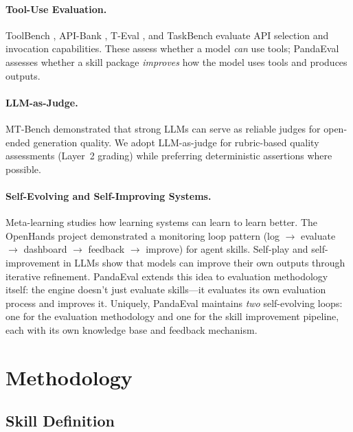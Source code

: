 \documentclass[11pt,a4paper]{article}
\begin{document}
\paragraph{Tool-Use Evaluation.}
ToolBench \citep{qin2023toolllm}, API-Bank \citep{li2023apibank}, T-Eval \citep{chen2023teval}, and TaskBench \citep{shen2023taskbench} evaluate API selection and invocation capabilities. These assess whether a model \emph{can} use tools; PandaEval assesses whether a skill package \emph{improves} how the model uses tools and produces outputs.

\paragraph{LLM-as-Judge.}
MT-Bench \citep{zheng2023judging} demonstrated that strong LLMs can serve as reliable judges for open-ended generation quality. We adopt LLM-as-judge for rubric-based quality assessments (Layer~2 grading) while preferring deterministic assertions where possible.

\paragraph{Self-Evolving and Self-Improving Systems.}
Meta-learning \citep{hospedales2022metalearning} studies how learning systems can learn to learn better. The OpenHands project demonstrated a monitoring loop pattern (log $\rightarrow$ evaluate $\rightarrow$ dashboard $\rightarrow$ feedback $\rightarrow$ improve) for agent skills. Self-play and self-improvement in LLMs \citep{huang2023selfimprove} show that models can improve their own outputs through iterative refinement. PandaEval extends this idea to evaluation methodology itself: the engine doesn't just evaluate skills---it evaluates its own evaluation process and improves it. Uniquely, PandaEval maintains \emph{two} self-evolving loops: one for the evaluation methodology and one for the skill improvement pipeline, each with its own knowledge base and feedback mechanism.

\section{Methodology}
\label{sec:method}

\subsection{Skill Definition}
\end{document}
